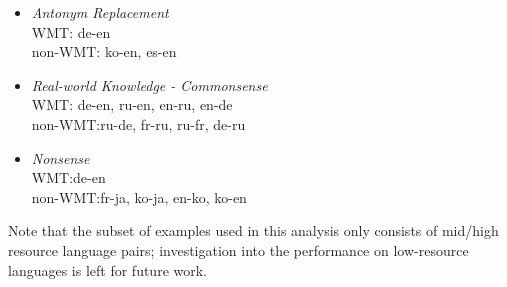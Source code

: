 \documentclass[11pt]{article}
\begin{document}
\begin{itemize}
    \item[] \textit{Antonym Replacement}\\
    WMT: \hfill de-en\\
    non-WMT: \hfill ko-en, es-en
    \item[] \textit{Real-world Knowledge - Commonsense}\\
    WMT: \hfill de-en, ru-en, en-ru, en-de\\
    non-WMT:\hfill ru-de, fr-ru, ru-fr, de-ru
    \item[] \textit{Nonsense}\\
    WMT:\hfill de-en\\
    non-WMT:\hfill fr-ja, ko-ja, en-ko, ko-en
\end{itemize}

\noindent Note that the subset of examples used in this analysis only consists of mid/high resource language pairs; investigation into the performance on low-resource languages is left for future work.
\end{document}
